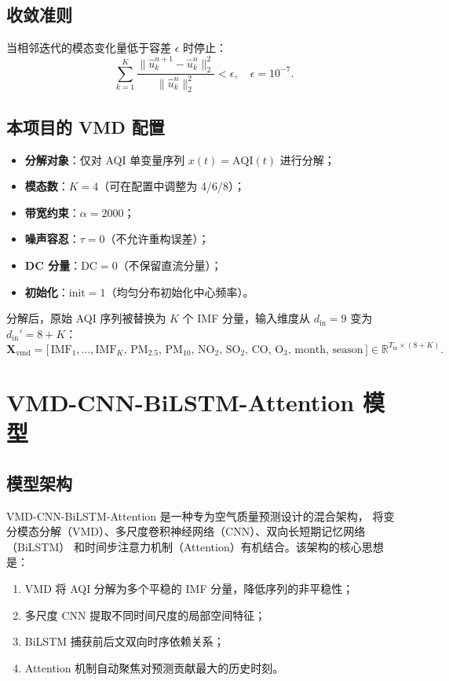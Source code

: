 \documentclass[11pt,a4paper]{article}
\newcommand{\R}{\mathbb{R}}
\newcommand{\mat}[1]{\bm{#1}}
\begin{document}
\subsection{收敛准则}
当相邻迭代的模态变化量低于容差 $\epsilon$ 时停止：
\begin{equation}
\sum_{k=1}^{K} \frac{\|\hat{u}_k^{n+1} - \hat{u}_k^n\|_2^2}{\|\hat{u}_k^n\|_2^2} < \epsilon, \quad \epsilon = 10^{-7}.
\end{equation}

\subsection{本项目的 VMD 配置}
\begin{itemize}[leftmargin=*]
  \item \textbf{分解对象}：仅对 AQI 单变量序列 $x(t) = \text{AQI}(t)$ 进行分解；
  \item \textbf{模态数}：$K = 4$（可在配置中调整为 4/6/8）；
  \item \textbf{带宽约束}：$\alpha = 2000$；
  \item \textbf{噪声容忍}：$\tau = 0$（不允许重构误差）；
  \item \textbf{DC 分量}：$\text{DC} = 0$（不保留直流分量）；
  \item \textbf{初始化}：$\text{init} = 1$（均匀分布初始化中心频率）。
\end{itemize}

分解后，原始 AQI 序列被替换为 $K$ 个 IMF 分量，输入维度从 $d_{\text{in}} = 9$ 变为 $d_{\text{in}}' = 8 + K$：
\[
\mat{X}_{\text{vmd}} = \bigl[\,\text{IMF}_1, \dots, \text{IMF}_K,\, \text{PM}_{2.5},\, \text{PM}_{10},\, \text{NO}_2,\, \text{SO}_2,\, \text{CO},\, \text{O}_3,\, \text{month},\, \text{season}\,\bigr] \in \R^{T_{\text{in}} \times (8+K)}.
\]

\section{VMD-CNN-BiLSTM-Attention 模型}

\subsection{模型架构}
VMD-CNN-BiLSTM-Attention 是一种专为空气质量预测设计的混合架构，
将变分模态分解（VMD）、多尺度卷积神经网络（CNN）、双向长短期记忆网络（BiLSTM）
和时间步注意力机制（Attention）有机结合。该架构的核心思想是：
\begin{enumerate}[leftmargin=*]
  \item VMD 将 AQI 分解为多个平稳的 IMF 分量，降低序列的非平稳性；
  \item 多尺度 CNN 提取不同时间尺度的局部空间特征；
  \item BiLSTM 捕获前后文双向时序依赖关系；
  \item Attention 机制自动聚焦对预测贡献最大的历史时刻。
\end{enumerate}
\end{document}
